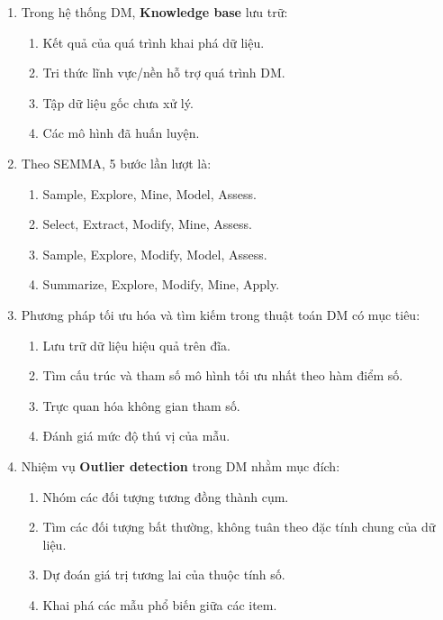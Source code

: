 \documentclass[10pt]{article}
\begin{document}
\begin{enumerate}[leftmargin=*, label=\textbf{Câu \arabic*.}]
    \item Trong hệ thống DM, \textbf{Knowledge base} lưu trữ:
    \begin{enumerate}[label=\Alph*.]
        \item Kết quả của quá trình khai phá dữ liệu.
        \item Tri thức lĩnh vực/nền hỗ trợ quá trình DM.
        \item Tập dữ liệu gốc chưa xử lý.
        \item Các mô hình đã huấn luyện.
    \end{enumerate}

    \item Theo SEMMA, 5 bước lần lượt là:
    \begin{enumerate}[label=\Alph*.]
        \item Sample, Explore, Mine, Model, Assess.
        \item Select, Extract, Modify, Mine, Assess.
        \item Sample, Explore, Modify, Model, Assess.
        \item Summarize, Explore, Modify, Mine, Apply.
    \end{enumerate}

    \item Phương pháp tối ưu hóa và tìm kiếm trong thuật toán DM có mục tiêu:
    \begin{enumerate}[label=\Alph*.]
        \item Lưu trữ dữ liệu hiệu quả trên đĩa.
        \item Tìm cấu trúc và tham số mô hình tối ưu nhất theo hàm điểm số.
        \item Trực quan hóa không gian tham số.
        \item Đánh giá mức độ thú vị của mẫu.
    \end{enumerate}

    \item Nhiệm vụ \textbf{Outlier detection} trong DM nhằm mục đích:
    \begin{enumerate}[label=\Alph*.]
        \item Nhóm các đối tượng tương đồng thành cụm.
        \item Tìm các đối tượng bất thường, không tuân theo đặc tính chung của dữ liệu.
        \item Dự đoán giá trị tương lai của thuộc tính số.
        \item Khai phá các mẫu phổ biến giữa các item.
    \end{enumerate}


\end{enumerate}
\end{document}
